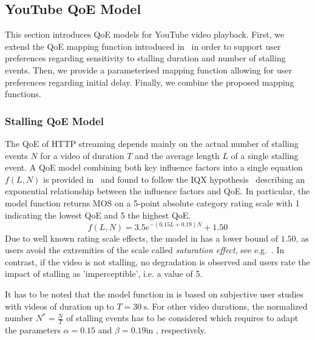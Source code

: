 \subsection{YouTube QoE Model}\label{sec:application:qoe_user_behaviour:typical_user_scenarios:youtube_qoe}
This section introduces \gls{QoE} models for YouTube video playback.
First, we extend the \gls{QoE} mapping function introduced in~\cite{Hossfeld2013c} in order to support user preferences regarding sensitivity to stalling duration and number of stalling events.
Then, we provide a parameterised mapping function allowing for user preferences regarding initial delay.
Finally, we combine the proposed mapping functions.

\subsubsection*{Stalling QoE Model}\label{sec:application:qoe_user_behaviour:typical_user_scenarios:youtube_qoe:stalling}
The \gls{QoE} of \gls{HTTP} streaming depends mainly on the actual number of stalling events \(N\) for a video of duration \(T\) and the average length \(L\) of a single stalling event.
A \gls{QoE} model combining both key influence factors into a single equation \(f(L,N)\) is provided in~\cite{Hossfeld2013c} and found to follow the IQX hypothesis~\cite{Fiedler2010} describing an exponential relationship between the influence factors and \gls{QoE}.
In particular, the model function returns \gls{MOS} on a 5-point absolute category rating scale with 1 indicating the lowest \gls{QoE} and 5 the highest \gls{QoE}. 
\begin{equation}
 f(L,N) = 3.5 e^{-(0.15L + 0.19)N}+1.50
\label{eq:application:qoe_user_behaviour:typical_user_scenarios:youtube_qoe:stalling:original_model}
\end{equation}
Due to well known rating scale effects, the model in  has a lower bound of \(1.50\), as users avoid the extremities of the scale called \emph{saturation effect}, see e.g.~\cite{Moller2000}.
In contrast, if the video is not stalling, no degradation is observed and users rate the impact of stalling as 'imperceptible', i.e. a value of 5.

It has to be noted that the model function in  is based on subjective user studies with videos of duration up to \(T=\SI{30}{\second}\).
For other video durations, the normalized number \(N^*=\frac{N}{T}\) of stalling events has to be considered which requires to adapt the parameters \(\alpha=0.15\) and \(\beta=0.19\)in , respectively. 

